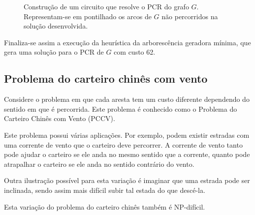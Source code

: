 \begin{enumerate}
\begin{figure}[H]
            \caption{Construção de um circuito que resolve o PCR do grafo $G$. Representam-se em pontilhado os arcos de $G$ não percorridos na solução desenvolvida.}
            \label{solucaoPCR}
        \end{figure}
	\end{enumerate}

    Finaliza-se assim a execução da heurística da arborescência geradora mínima, que gera uma solução para o PCR de $G$ com custo 62.

    \subsection{Problema do carteiro chinês com vento}

        Considere o problema em que cada aresta tem um custo diferente dependendo do sentido em que é percorrida. Este problema é conhecido como o Problema do Carteiro Chinês com Vento (PCCV).

        Este problema possui várias aplicações. 
        Por exemplo, podem existir estradas com uma corrente de vento que o carteiro deve percorrer. 
        A corrente de vento tanto pode ajudar o carteiro se ele anda no mesmo sentido que a corrente, quanto pode atrapalhar o carteiro se ele anda no sentido contrário do vento.

        Outra ilustração possível para esta variação é imaginar que uma estrada pode ser inclinada, sendo assim mais difícil subir tal estada do que descé-la.

        Esta variação do problema do carteiro chinês também é NP-difícil.

